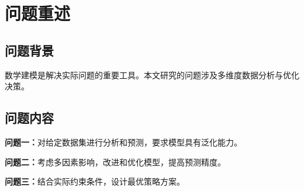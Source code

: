 \section{问题重述}

\subsection{问题背景}

数学建模是解决实际问题的重要工具。本文研究的问题涉及多维度数据分析与优化决策。

\subsection{问题内容}

\textbf{问题一：}对给定数据集进行分析和预测，要求模型具有泛化能力。

\textbf{问题二：}考虑多因素影响，改进和优化模型，提高预测精度。

\textbf{问题三：}结合实际约束条件，设计最优策略方案。
